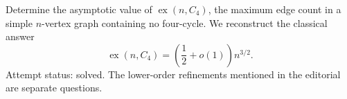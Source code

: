 Determine the asymptotic value of \(\operatorname{ex}(n,C_4)\), the maximum edge count in a simple \(n\)-vertex graph containing no four-cycle. We reconstruct the classical answer
\[
\operatorname{ex}(n,C_4)=\left(\frac12+o(1)\right)n^{3/2}.
\]
Attempt status: solved. The lower-order refinements mentioned in the editorial are separate questions.
